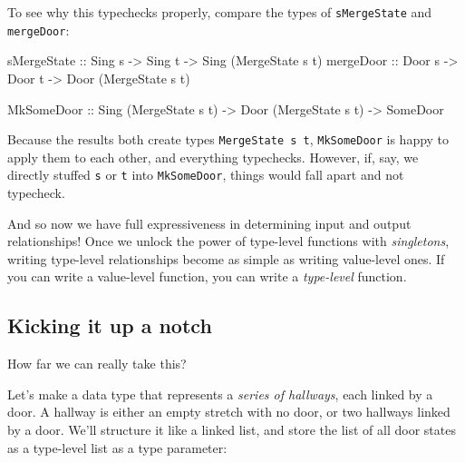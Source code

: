 \documentclass[]{article}
\newenvironment{Shaded}{}{}
\newcommand{\DataTypeTok}[1]{\textcolor[rgb]{0.56,0.13,0.00}{#1}}
\newcommand{\NormalTok}[1]{#1}
\newcommand{\OtherTok}[1]{\textcolor[rgb]{0.00,0.44,0.13}{#1}}
\begin{document}
To see why this typechecks properly, compare the types of \texttt{sMergeState}
and \texttt{mergeDoor}:

\begin{Shaded}
\begin{Highlighting}[]
\OtherTok{sMergeState ::} \DataTypeTok{Sing}\NormalTok{ s }\OtherTok{{-}>} \DataTypeTok{Sing}\NormalTok{ t }\OtherTok{{-}>} \DataTypeTok{Sing}\NormalTok{ (}\DataTypeTok{MergeState}\NormalTok{ s t)}
\OtherTok{mergeDoor   ::} \DataTypeTok{Door}\NormalTok{ s }\OtherTok{{-}>} \DataTypeTok{Door}\NormalTok{ t }\OtherTok{{-}>} \DataTypeTok{Door}\NormalTok{ (}\DataTypeTok{MergeState}\NormalTok{ s t)}

\DataTypeTok{MkSomeDoor}\OtherTok{  ::} \DataTypeTok{Sing}\NormalTok{ (}\DataTypeTok{MergeState}\NormalTok{ s t) }\OtherTok{{-}>} \DataTypeTok{Door}\NormalTok{ (}\DataTypeTok{MergeState}\NormalTok{ s t) }\OtherTok{{-}>} \DataTypeTok{SomeDoor}
\end{Highlighting}
\end{Shaded}

Because the results both create types \texttt{MergeState\ s\ t},
\texttt{MkSomeDoor} is happy to apply them to each other, and everything
typechecks. However, if, say, we directly stuffed \texttt{s} or \texttt{t} into
\texttt{MkSomeDoor}, things would fall apart and not typecheck.

And so now we have full expressiveness in determining input and output
relationships! Once we unlock the power of type-level functions with
\emph{singletons}, writing type-level relationships become as simple as writing
value-level ones. If you can write a value-level function, you can write a
\emph{type-level} function.

\hypertarget{kicking-it-up-a-notch}{%
\subsection{Kicking it up a notch}\label{kicking-it-up-a-notch}}

How far we can really take this?

Let's make a data type that represents a \emph{series of hallways}, each linked
by a door. A hallway is either an empty stretch with no door, or two hallways
linked by a door. We'll structure it like a linked list, and store the list of
all door states as a type-level list as a type parameter:
\end{document}
